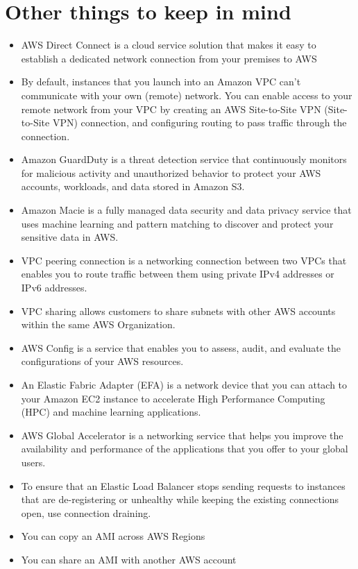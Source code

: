 \documentclass[]{scrartcl}
\begin{document}
\section{Other things to keep in mind}
\begin{itemize}
	\item AWS Direct Connect is a cloud service solution that makes it easy to establish a dedicated network connection from your premises to AWS
	\item By default, instances that you launch into an Amazon VPC can't communicate with your own (remote) network. You can enable access to your remote network from your VPC by creating an AWS Site-to-Site VPN (Site-to-Site VPN) connection, and configuring routing to pass traffic through the connection.
	\item Amazon GuardDuty is a threat detection service that continuously monitors for malicious activity and unauthorized behavior to protect your AWS accounts, workloads, and data stored in Amazon S3.
	\item Amazon Macie is a fully managed data security and data privacy service that uses machine learning and pattern matching to discover and protect your sensitive data in AWS.
	\item VPC peering connection is a networking connection between two VPCs that enables you to route traffic between them using private IPv4 addresses or IPv6 addresses.
	\item VPC sharing allows customers to share subnets with other AWS accounts within the same AWS Organization.
	\item AWS Config is a service that enables you to assess, audit, and evaluate the configurations of your AWS resources.
	\item An Elastic Fabric Adapter (EFA) is a network device that you can attach to your Amazon EC2 instance to accelerate High Performance Computing (HPC) and machine learning applications. 
	\item AWS Global Accelerator is a networking service that helps you improve the availability and performance of the applications that you offer to your global users.
	\item To ensure that an Elastic Load Balancer stops sending requests to instances that are de-registering or unhealthy while keeping the existing connections open, use connection draining. 
	\item You can copy an AMI across AWS Regions
	\item You can share an AMI with another AWS account

\end{itemize}
\end{document}
